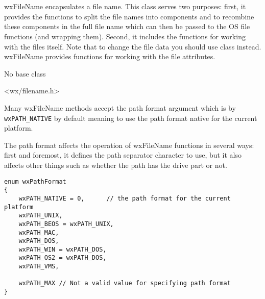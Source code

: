 
\section{}\label{wxfilename}

wxFileName encapsulates a file name. This class serves two purposes: first, it
provides the functions to split the file names into components and to recombine
these components in the full file name which can then be passed to the OS file
functions (and  wrapping them).
Second, it includes the functions for working with the files itself. Note that
to change the file data you should use  class instead.
wxFileName provides functions for working with the file attributes.


No base class


<wx/filename.h>


Many wxFileName methods accept the path format argument which is by\rtfsp
{\tt wxPATH\_NATIVE} by default meaning to use the path format native for the
current platform.

The path format affects the operation of wxFileName functions in several ways:
first and foremost, it defines the path separator character to use, but it also
affects other things such as whether the path has the drive part or not.

\begin{verbatim}
enum wxPathFormat
{
    wxPATH_NATIVE = 0,      // the path format for the current platform
    wxPATH_UNIX,
    wxPATH_BEOS = wxPATH_UNIX,
    wxPATH_MAC,
    wxPATH_DOS,
    wxPATH_WIN = wxPATH_DOS,
    wxPATH_OS2 = wxPATH_DOS,
    wxPATH_VMS,

    wxPATH_MAX // Not a valid value for specifying path format
}
\end{verbatim}

